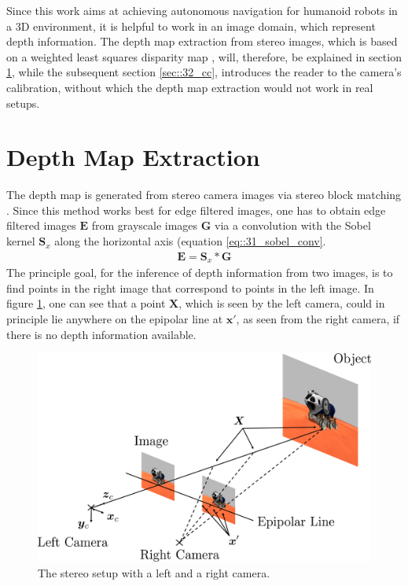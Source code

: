 \FloatBarrier
\label{sec::3_ip}
Since this work aims at achieving autonomous navigation for humanoid robots in a 3D environment, it is helpful to work in an image domain, which represent depth information. The depth map extraction from stereo images, which is based on a weighted least squares disparity map \cite{min2014fast}, will, therefore, be explained in section \ref{sec::31_dm}, while the subsequent section \ref{sec::32_cc}, introduces the reader to the camera's calibration, without which the depth map extraction would not work in real setups.
\FloatBarrier
\section{Depth Map Extraction}
\label{sec::31_dm}
The depth map is generated from stereo camera images via stereo block matching \cite{hamzah2010sum}. Since this method works best for edge filtered images, one has to obtain edge filtered images $\bm{E}$ from grayscale images $\bm{G}$ via a convolution with the Sobel kernel $\bm{S}_x$ along the horizontal axis \cite{sobel2014an} (equation \ref{eq::31_sobel_conv}. 
\begin{align}
	\bm{E} = \bm{S}_x*\bm{G}
	\label{eq::31_sobel_conv}
\end{align}
The principle goal, for the inference of depth information from two images, is to find points in the right image that correspond to points in the left image. In figure \ref{fig::31_stereo_camera}, one can see that a point $\bm{X}$, which is seen by the left camera, could in principle lie anywhere on the epipolar line at $\bm{x}'$, as seen from the right camera, if there is no depth information available. 
\begin{figure}[h!]
	\centering
	\includegraphics[scale=.28]{chapters/03_fundamentals_of_image_processing/img/stereo_camera.png}
	\caption{The stereo setup with a left and a right camera.}
	\label{fig::31_stereo_camera}
\end{figure}
